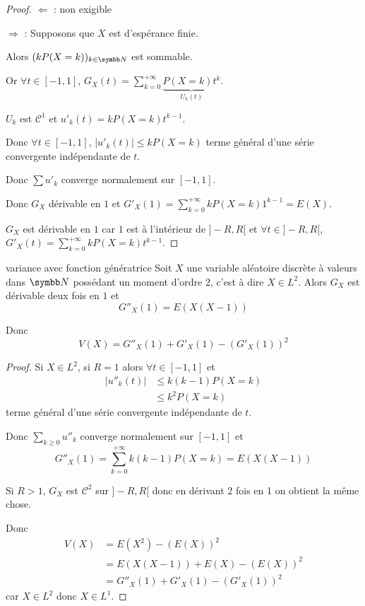 \begin{proof}
    $\Leftarrow$ : non exigible 

    $\Rightarrow$ : Supposons que $X$ est d'espérance finie.
    

    Alors 
    $(k P(X = k))_{k \in \N}$ est sommable. 

    Or $\forall t \in [-1, 1]$, $G_X(t) = \sum_{k = 0}^{+\infty} \underbrace{P(X = k) t^k}_{U_k(t)}$.

    $U_k$ est $\mathscr C^1$ et $u'_k(t) = k P(X = k) t^{k - 1}$.

    Donc $\forall t \in [-1, 1]$, $|u'_k(t)| \leqslant k P(X = k)$ terme général d'une série convergente 
    indépendante de $t$. 

    Donc $\sum u'_k$ converge normalement sur $[-1, 1]$.

    Donc $G_X$ dérivable en $1$ et $\displaystyle G'_X(1) = \sum_{k = 0}^{+\infty} k P(X = k) 1^{k - 1} = E(X)$.


    $G_X$ est dérivable en $1$ car $1$ est à l'intérieur de $]-R, R[$
    et $\forall t \in ]-R, R[$, $\displaystyle G'_X(t) = \sum_{k = 0}^{+\infty} k P(X = k) t^{k - 1}$.
\end{proof}

\begin{corollaire}{variance avec fonction génératrice}{}
    Soit $X$ une variable aléatoire discrète à  valeurs dans $\N$ possédant un moment 
    d'ordre $2$, c'est à dire $X \in L^2$. Alors 
    $G_X$ est dérivable deux fois en $1$ et
    $$ G''_X(1) = E(X(X - 1)) $$

    Donc $$ V(X) = G''_X(1) + G'_X(1) - (G'_X(1))^2 $$
\end{corollaire}

\begin{proof}
    Si $X \in L^2$, si $R = 1$ alors 
    $\forall t \in [-1, 1]$ et 
    \begin{align}
        |u''_k(t)| & \leqslant k(k - 1) P(X = k) \\
        & \leqslant k^2 P(X = k)
    \end{align}
    terme général d'une série convergente indépendante de $t$.

    Donc $\sum_{k \geqslant 0} u''_k$ converge normalement sur $[-1, 1]$ et 
    $$G''_X(1) = \sum_{k = 0}^{+\infty} k (k - 1) P(X = k) = E(X(X - 1))$$

    Si $R > 1$, $G_X$ est $\mathscr C^2$ sur $]-R, R[$ donc en dérivant 2 fois en 1 on obtient 
    la même chose.

    Donc \begin{align}
        V(X) & = E(X^2) - (E(X))^2 \\
        & = E(X(X - 1)) + E(X) - (E(X))^2 \\
        & = G''_X(1) + G'_X(1) - (G'_X(1))^2
    \end{align}
    car $X \in L^2$ donc $X \in L^1$.
\end{proof}

